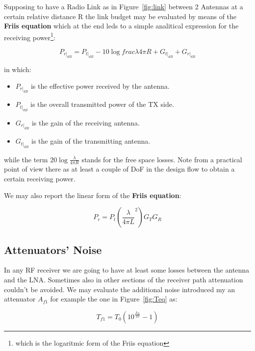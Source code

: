 Supposing to have a Radio Link as in Figure~\ref{fig:link} between 2 Antennas at a certain relative distance R the link budget may be evaluated by means of the \textbf{Friis equation} which at the end leds to a simple analitical expression for the receiving power\footnote{which is the logaritmic form of the Friis equation}:

\begin{equation}	
P_{r|_{dB}} = P_{t|_{dB}} - 10 \log{frac{\lambda}{4\pi R}} + G_{t|_{dB}} + G_{r|_{dB}} 
\end{equation}

in which:

\begin{itemize}
	\item $P_{r|_{dB}}$ is the effective power received by the antenna.
	\item $P_{t|_{dB}}$ is the overall transmitted power of the TX side.
	\item $G_{r|_{dB}}$ is the gain of the receiving antenna.
	\item $G_{t|_{dB}}$ is the gain of the transmitting antenna.
\end{itemize}

while the term $20\log{ \frac{\lambda}{4 \pi R} }$ stands for the free space losses.
Note from a practical point of view there as at least a couple of DoF in the design flow to obtain a certain receiving power.

We may also report the linear form of the \textbf{Friis equation}:

\begin{equation}
P_r = P_t  \left( \frac { \lambda } {4 \pi L}^2 \right) G_T G_R
\end{equation}




\subsection{Attenuators' Noise} %
\label{sub:noise_of_attenuators}

In any RF receiver we are going to have at least some losses between the antenna and the LNA. Sometimes also in other sections of the receiver path attenuation couldn't be avoided.
We may evaluate the additional noise introduced my an attenuator $A_{f1}$ for example the one in Figure~\ref{fig:Teq} as:

\begin{equation}
	T_{f1} = T_0 (10^{ \frac {A_{f1}} {10} }-1)
\end{equation}

